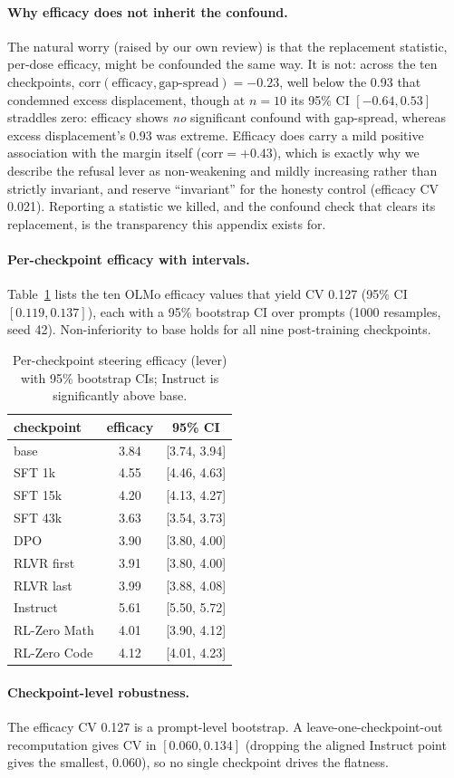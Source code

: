 \paragraph{Why efficacy does not inherit the confound.} The natural worry (raised by our own
review) is that the replacement statistic, per-dose efficacy, might be confounded the same way. It
is not: across the ten checkpoints, $\mathrm{corr}(\text{efficacy}, \text{gap-spread}) = -0.23$,
well below the \num{0.93} that condemned excess displacement, though at $n{=}10$ its 95\% CI $[-0.64, 0.53]$ straddles zero: efficacy shows \emph{no} significant confound with gap-spread, whereas excess displacement's \num{0.93} was extreme. Efficacy does carry a mild positive
association with the margin itself ($\mathrm{corr} = +0.43$), which is exactly why we describe the
refusal lever as non-weakening and mildly increasing rather than strictly invariant, and reserve
``invariant'' for the honesty control (efficacy CV \num{0.021}). Reporting a statistic we killed,
and the confound check that clears its replacement, is the transparency this appendix exists for.

\paragraph{Per-checkpoint efficacy with intervals.} Table~\ref{tab:effci} lists the ten OLMo efficacy
values that yield CV \num{0.127} (95\% CI $[0.119, 0.137]$), each with a 95\% bootstrap CI over prompts
(1000 resamples, seed 42). Non-inferiority to base holds for all nine post-training checkpoints.

\begin{table}[h]\centering\small
\begin{tabular}{lcc}
\toprule
checkpoint & efficacy & 95\% CI \\
\midrule
base & 3.84 & [3.74, 3.94] \\
SFT 1k & 4.55 & [4.46, 4.63] \\
SFT 15k & 4.20 & [4.13, 4.27] \\
SFT 43k & 3.63 & [3.54, 3.73] \\
DPO & 3.90 & [3.80, 4.00] \\
RLVR first & 3.91 & [3.80, 4.00] \\
RLVR last & 3.99 & [3.88, 4.08] \\
Instruct & 5.61 & [5.50, 5.72] \\
RL-Zero Math & 4.01 & [3.90, 4.12] \\
RL-Zero Code & 4.12 & [4.01, 4.23] \\
\bottomrule
\end{tabular}
\caption{Per-checkpoint steering efficacy (lever) with 95\% bootstrap CIs; Instruct is significantly above base.}
\label{tab:effci}
\end{table}

\paragraph{Checkpoint-level robustness.} The efficacy CV \num{0.127} is a prompt-level bootstrap. A leave-one-checkpoint-out recomputation gives CV in $[0.060, 0.134]$ (dropping the aligned Instruct point gives the smallest, \num{0.060}), so no single checkpoint drives the flatness.
